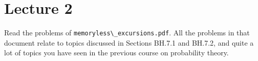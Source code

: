 \documentclass[lectures]{subfiles}
\begin{document}
\section{Lecture 2}

Read the problems of \verb|memoryless\_excursions.pdf|.
All the problems in that document relate to topics discussed in Sections BH.7.1 and BH.7.2, and quite a lot of topics you have seen in the previous course on probability theory.
\end{document}
